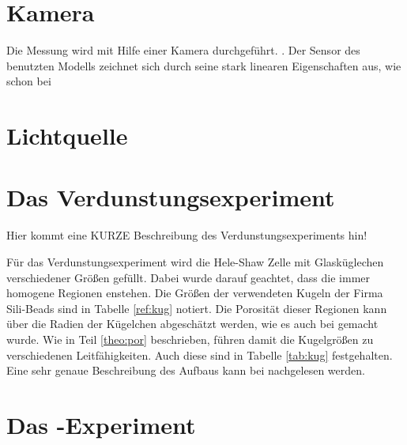 \section{Kamera}
\label{sec:cam}
Die Messung wird mit Hilfe einer Kamera durchgeführt. . Der Sensor des benutzten Modells zeichnet sich durch seine stark linearen Eigenschaften aus, wie schon bei \cite{buchner}

\section{Lichtquelle}
\label{sec:light}


\section{Das Verdunstungsexperiment}
\label{set:eva}

Hier kommt eine KURZE Beschreibung des Verdunstungsexperiments hin!

Für das Verdunstungsexperiment wird die Hele-Shaw Zelle mit Glasküglechen verschiedener Größen gefüllt. Dabei wurde darauf geachtet, dass die immer homogene Regionen enstehen. Die Größen der verwendeten Kugeln der Firma Sili-Beads sind in Tabelle \ref{ref:kug} notiert. Die Porosität
dieser Regionen kann über die Radien der Kügelchen abgeschätzt werden, wie es auch bei \cite{feustel} gemacht wurde. 
Wie in Teil \ref{theo:por} beschrieben, führen damit die Kugelgrößen zu verschiedenen Leitfähigkeiten. Auch diese sind in Tabelle \ref{tab:kug} festgehalten.
Eine sehr genaue Beschreibung des Aufbaus kann bei \cite{buchner,heberle} nachgelesen werden.


\section{Das \COT-Experiment}
\label{set:cot}
